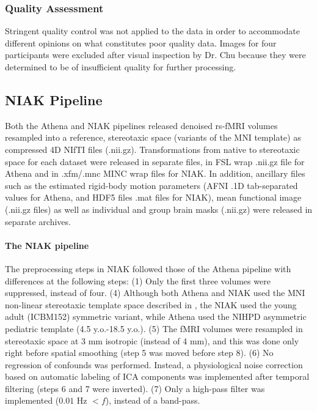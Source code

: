 \documentclass[preprint,12pt,3p]{elsarticle}
\begin{document}
\subsubsection{Quality Assessment}
Stringent quality control was not applied to the data in order to accommodate different opinions on what constitutes poor quality data. Images for four participants were excluded after visual inspection by Dr. Chu because they were determined to be of insufficient quality for further processing.

\subsection{NIAK Pipeline}

Both the Athena and NIAK pipelines released denoised rs-fMRI volumes resampled into a reference, stereotaxic space (variants of the MNI template) as compressed 4D NIfTI files (.nii.gz). Transformations from native to stereotaxic space for each dataset were released in separate files, in FSL wrap .nii.gz file for Athena and in .xfm/.mnc MINC wrap files for NIAK. In addition, ancillary files such as the estimated rigid-body motion parameters (AFNI .1D tab-separated values for Athena, and HDF5 files .mat files for NIAK), mean functional image (.nii.gz files) as well as individual and group brain masks (.nii.gz) were released in separate archives. 

\paragraph{The NIAK pipeline} The preprocessing steps in NIAK followed those of the Athena pipeline with differences at the following steps: (1) Only the first three volumes were suppressed, instead of four. (4) Although both Athena and NIAK used the MNI non-linear stereotaxic template space described in \citep{fonov2011unbiased}, the NIAK used the young adult (ICBM152) symmetric variant, while Athena used the NIHPD asymmetric pediatric template (4.5 y.o.-18.5 y.o.). (5) The fMRI volumes were resampled in stereotaxic space at 3 mm isotropic (instead of 4 mm), and this was done only right before spatial smoothing (step 5 was moved before step 8). (6) No regression of confounds was performed. Instead, a physiological noise correction based on automatic labeling of ICA components was implemented \citep{perlbarg2007corsica} after temporal filtering (steps 6 and 7 were inverted). (7) Only a high-pass filter was implemented ($0.01$ Hz $< f$), instead of a band-pass. 
\end{document}
